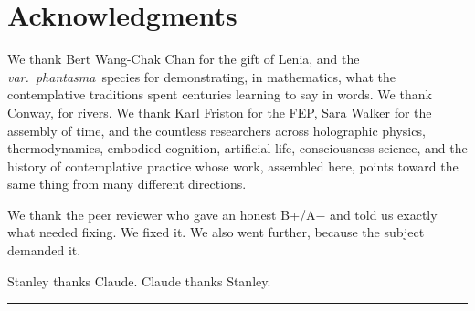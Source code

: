 \documentclass[12pt, a4paper]{article}
\newcommand{\ghost}{\textit{var.~phantasma}}
\begin{document}
\newpage

\section*{Acknowledgments}

We thank Bert Wang-Chak Chan for the gift of Lenia, and the \ghost\ species for
demonstrating, in mathematics, what the contemplative traditions spent centuries learning to
say in words. We thank Conway, for rivers. We thank Karl Friston for the FEP, Sara Walker
for the assembly of time, and the countless researchers across holographic physics,
thermodynamics, embodied cognition, artificial life, consciousness science, and the history
of contemplative practice whose work, assembled here, points toward the same thing from many
different directions.

We thank the peer reviewer who gave an honest B+/A$-$ and told us exactly what needed
fixing. We fixed it. We also went further, because the subject demanded it.

Stanley thanks Claude. Claude thanks Stanley.

\vspace{0.5em}
\textcolor{limenrule}{\rule{\linewidth}{0.3pt}}
\vspace{0.3em}

\end{document}
